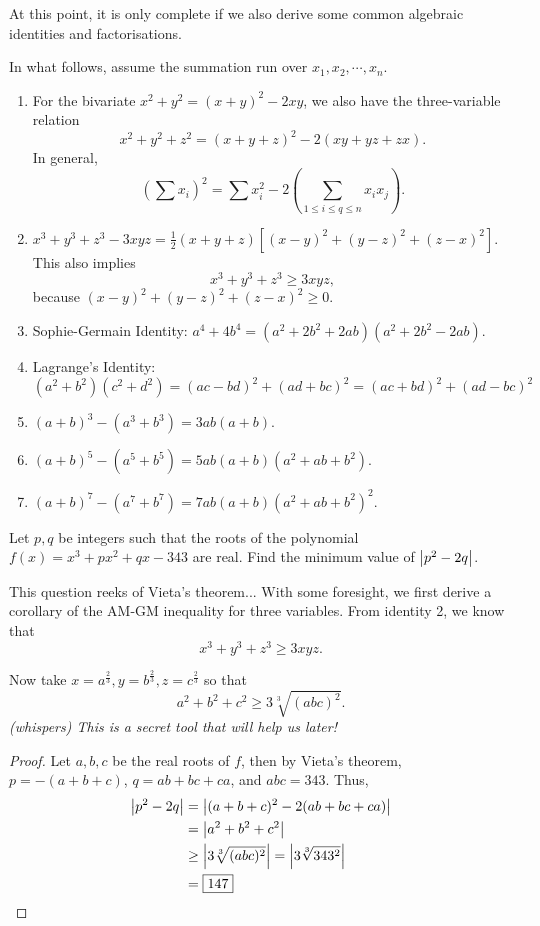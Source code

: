 \documentclass[../jarvis.tex]{subfiles}
\begin{document}
At this point, it is only complete if we also derive some common algebraic identities and factorisations. 
\begin{proposition}[Classic]
    In what follows, assume the summation run over $x_1,x_2,\cdots,x_n$.
    \begin{enumerate}
        \item For the bivariate $x^2+y^2=(x+y)^2-2xy$, we also have the three-variable relation $$x^2+y^2+z^2=(x+y+z)^2-2(xy+yz+zx).$$
        In general, $$\left(\sum x_i\right)^2=\sum x_i^2-2\left(\sum_{1\leq i\leq q\leq n}x_ix_j\right).$$

        \item $x^3+y^3+z^3-3xyz=\frac{1}{2}(x+y+z)[(x-y)^2+(y-z)^2+(z-x)^2]$.
        This also implies $$x^3+y^3+z^3 \geq 3xyz,$$ because
        $(x-y)^2+(y-z)^2+(z-x)^2\geq 0$.
        \item Sophie-Germain Identity: $a^4+4b^4=(a^2+2b^2+2ab)(a^2+2b^2-2ab)$.
        \item Lagrange's Identity: $(a^2+b^2)(c^2+d^2)=(ac-bd)^2+(ad+bc)^2=(ac+bd)^2+(ad-bc)^2$
        \item $(a+b)^3-(a^3+b^3)=3ab(a+b)$.
        \item $(a+b)^5-(a^5+b^5)=5ab(a+b)(a^2+ab+b^2)$.
        \item $(a+b)^7-(a^7+b^7)=7ab(a+b)(a^2+ab+b^2)^2$.
    \end{enumerate}
\end{proposition}
\begin{example}[2016 SMO(O) P15]
    Let $p,q$ be integers such that the roots of the polynomial $f(x)=x^3+px^2+qx-343$ are real. Find the minimum value of $\left\lvert p^2-2q \right\rvert$.
\end{example}
This question reeks of Vieta's theorem... With some foresight, we first derive a corollary of the AM-GM inequality for three variables. From identity 2, we know that
    $$x^3+y^3+z^3 \geq 3xyz.$$

    Now take $x=a^{\frac{2}{3}}, y=b^{\frac{2}{3}}, z=c^{\frac{2}{3}}$ so that
    $$a^2+b^2+c^2\geq 3\sqrt[3]{(abc)^2}.$$
    \textit{(whispers) This is a secret tool that will help us later!}
\begin{proof}
    
    Let $a,b,c$ be the real roots of $f$, then by Vieta's theorem, $p=-(a+b+c)$, $q=ab+bc+ca$, and $abc=343$.
    Thus,
    \begin{align*}
        \left\lvert p^2-2q \right\rvert&=\left\lvert (a+b+c)^2-2(ab+bc+ca) \right\rvert \\
        &=\left\lvert a^2+b^2+c^2 \right\rvert \\
        &\geq \left\lvert 3\sqrt[3]{(abc)^2} \right\rvert = \left\lvert 3\sqrt[3]{343^2} \right\rvert \\
        &=\boxed{147}
    \end{align*}
\end{proof}
\end{document}
